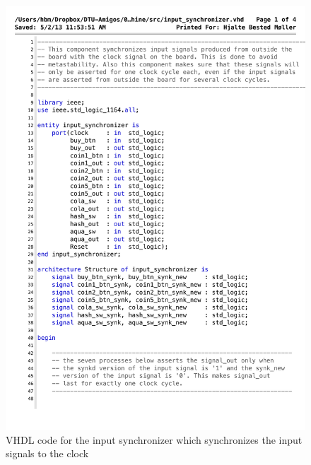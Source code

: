 \begin{figure}[!h]
\centering
\includegraphics[scale=0.6]{figs/input_synchronizer.pdf}
\caption{VHDL code for the input synchronizer which synchronizes the input signals to the clock}
\label{vhd:inpsync1}
\end{figure}

